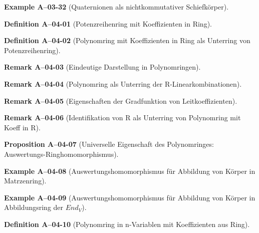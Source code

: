 \documentclass[10pt, letterpaper]{article}
\newcommand{\CustomHeading}[3]{%
  \par\medskip\noindent%
  \textbf{#1 #2} \textnormal{(#3)}.\enskip%
}
\newenvironment{DEF}[2]{\CustomHeading{Definition}{#1}{#2}}{}
\newenvironment{PROP}[2]{\CustomHeading{Proposition}{#1}{#2}}{}
\newenvironment{REM}[2]{\CustomHeading{Remark}{#1}{#2}}{}
\newenvironment{EXA}[2]{\CustomHeading{Example}{#1}{#2}}{}
\begin{document}
\begin{EXA}{A--03-32}{Quaternionen als nichtkommutativer Schiefkörper}
\end{EXA}

\begin{DEF}{A--04-01}{Potenzreihenring mit Koeffizienten in Ring}
\end{DEF}

\begin{DEF}{A--04-02}{Polynomring mit Koeffizienten in Ring als Unterring von Potenzreihenring}
\end{DEF}

\begin{REM}{A--04-03}{Eindeutige Darstellung in Polynomringen}
\end{REM}

\begin{REM}{A--04-04}{Polynomring als Unterring der R-Linearkombinationen}
\end{REM}

\begin{REM}{A--04-05}{Eigenschaften der Gradfunktion von Leitkoeffizienten}
\end{REM}

\begin{REM}{A--04-06}{Identifikation von R als Unterring von Polynomring mit Koeff in R}
\end{REM}

\begin{PROP}{A--04-07}{Universelle Eigenschaft des Polynomringes: Auswertungs-Ringhomomorphismus}
\end{PROP}

\begin{EXA}{A--04-08}{Auswertungshomomorphismus für Abbildung von Körper in Matrzenring}
\end{EXA}

\begin{EXA}{A--04-09}{Auswertungshomomorphismus für Abbildung von Körper in Abbildungsring der $End_V$}
\end{EXA}

\begin{DEF}{A--04-10}{Polynomring in n-Variablen mit Koeffizienten aus Ring}
\end{DEF}
\end{document}
